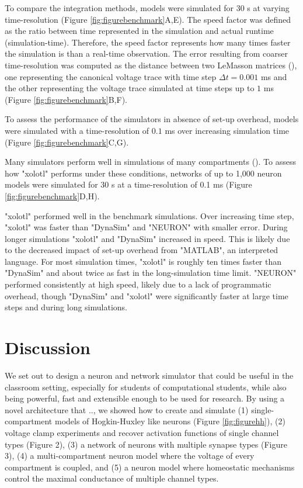 \documentclass{frontiersSCNS} %
\begin{document}
To compare the integration methods, models were simulated for 30 s at varying time-resolution (Figure \ref{fig:figurebenchmark}A,E). The speed factor was defined as the ratio between time represented in the simulation and actual runtime (simulation-time). Therefore, the speed factor represents how many times faster the simulation is than a real-time observation. The error resulting from coarser time-resolution was computed as the distance between two LeMasson matrices (\cite{lemassonIntroductionEquationSolving2000}), one representing the canonical voltage trace with time step $\Delta t = 0.001$ ms and the other representing the voltage trace simulated at time steps up to $1$ ms (Figure \ref{fig:figurebenchmark}B,F).

To assess the performance of the simulators in absence of set-up overhead, models were simulated with a time-resolution of $0.1$ ms over increasing simulation time (Figure \ref{fig:figurebenchmark}C,G).

Many simulators perform well in simulations of many compartments (\cite{bretteSimulationNetworksSpiking2007, sherfeyDynaSimMATLABToolbox2018, vitayANNarchyCodeGeneration2015, delormeSpikeNETEventdrivenSimulation2003}). To assess how "xolotl" performs under these conditions, networks of up to 1,000 neuron models were simulated for 30 s at a time-resolution of 0.1 ms (Figure \ref{fig:figurebenchmark}D,H).

"xolotl" performed well in the benchmark simulations. Over increasing time step, "xolotl" was faster than "DynaSim" and "NEURON" with smaller error. During longer simulations "xolotl" and "DynaSim" increased in speed. This is likely due to the decreased impact of set-up overhead from "MATLAB", an interpreted language. For most simulation times, "xolotl" is roughly ten times faster than "DynaSim" and about twice as fast in the long-simulation time limit. "NEURON" performed consistently at high speed, likely due to a lack of programmatic overhead, though "DynaSim" and "xolotl" were significantly faster at large time steps and during long simulations.

%
%
%
%
%
%

\section{Discussion}
\label{discussion}

We set out to design a neuron and network simulator that could be useful in the classroom setting, especially for students of computational students, while also being powerful, fast and extensible enough to be used for research. By using a novel architecture that .., we showed how to create and simulate (1) single-compartment models of Hogkin-Huxley like neurons (Figure \ref{fig:figurehh}), (2) voltage clamp experiments and recover activation functions of single channel types (Figure 2), (3) a network of neurons with multiple synapse types (Figure 3), (4) a multi-compartment neuron model where the voltage of every compartment is coupled, and (5) a neuron model where homeostatic mechanisms control the maximal conductance of multiple channel types. 
\end{document}
